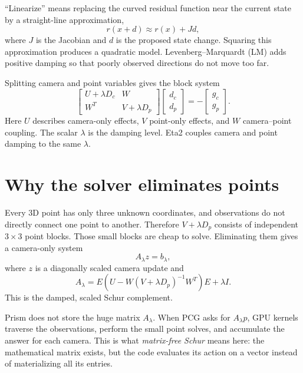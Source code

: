 \documentclass[11pt]{article}
\begin{document}
``Linearize'' means replacing the curved residual function near the current state by a straight-line approximation,
\[
  r(x+d)\approx r(x)+Jd,
\]
where $J$ is the Jacobian and $d$ is the proposed state change.  Squaring this approximation produces a quadratic model.  Levenberg--Marquardt (LM) adds positive damping so that poorly observed directions do not move too far.

Splitting camera and point variables gives the block system
\begin{equation}
\begin{bmatrix}
U+\lambda D_c & W\\
W^T & V+\lambda D_p
\end{bmatrix}
\begin{bmatrix}d_c\\d_p\end{bmatrix}
=-
\begin{bmatrix}g_c\\g_p\end{bmatrix}. \label{eq:plain-normal}
\end{equation}
Here $U$ describes camera-only effects, $V$ point-only effects, and $W$ camera--point coupling.  The scalar $\lambda$ is the damping level.  Eta2 couples camera and point damping to the same $\lambda$.

\section{Why the solver eliminates points}

Every 3D point has only three unknown coordinates, and observations do not directly connect one point to another.  Therefore $V+\lambda D_p$ consists of independent $3\times3$ point blocks.  Those small blocks are cheap to solve.  Eliminating them gives a camera-only system
\begin{equation}
  A_\lambda z=b_\lambda, \label{eq:plain-schur}
\end{equation}
where $z$ is a diagonally scaled camera update and
\begin{equation}
  A_\lambda
  =E\left(U-W(V+\lambda D_p)^{-1}W^T\right)E+\lambda I. \label{eq:plain-A}
\end{equation}
This is the damped, scaled Schur complement.

Prism does not store the huge matrix $A_\lambda$.  When PCG asks for $A_\lambda p$, GPU kernels traverse the observations, perform the small point solves, and accumulate the answer for each camera.  This is what \emph{matrix-free Schur} means here: the mathematical matrix exists, but the code evaluates its action on a vector instead of materializing all its entries.
\end{document}
